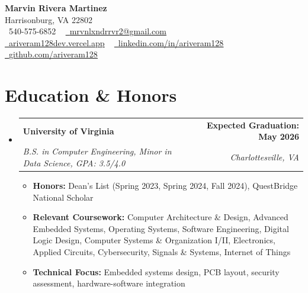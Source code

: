 \documentclass[letterpaper,11pt]{article}
\makeatletter
\newcommand{\resumeItem}[1]{
  \item\small{
    {#1 \vspace{-2pt}}
  }
}
\newcommand{\resumeSubheading}[4]{
  \vspace{-1pt}\item
    \begin{tabular*}{0.99\textwidth}[t]{l@{\extracolsep{\fill}}r}
      \textbf{#1} & \textbf{\small #2} \\
      \textit{\small#3} & \textit{\small #4} \\
    \end{tabular*}\vspace{-5pt}
}
\newcommand{\resumeSubHeadingListStart}{\begin{itemize}[leftmargin=0.0in, label={}]}
\newcommand{\resumeSubHeadingListEnd}{\end{itemize}}
\newcommand{\resumeItemListStart}{\begin{itemize}}
\newcommand{\resumeItemListEnd}{\end{itemize}\vspace{-3pt}}
\makeatother
\begin{document}
\begin{center}
    {\Huge \bfseries Marvin Rivera Martinez} \\ \vspace{1pt}
    Harrisonburg, VA 22802 \\ \vspace{1pt}
    \small \raisebox{-0.1\height}\faPhone\ 540-575-6852 ~ 
    \href{mailto:mrvnlxndrrvr2@gmail.com}{\raisebox{-0.2\height}\faEnvelope\ \underline{mrvnlxndrrvr2@gmail.com}} \\ \vspace{2pt}
    \href{https://ariveram128dev.vercel.app}{\raisebox{-0.2\height}\faGlobe\ \underline{ariveram128dev.vercel.app}} ~
    \href{https://linkedin.com/in/ariveram128}{\raisebox{-0.2\height}\faLinkedin\ \underline{linkedin.com/in/ariveram128}} ~
    \href{https://github.com/ariveram128}{\raisebox{-0.2\height}\faGithub\ \underline{github.com/ariveram128}}
    \vspace{-8pt}
\end{center}

\section{Education \& Honors}
  \resumeSubHeadingListStart
    \resumeSubheading
      {University of Virginia}{Expected Graduation: May 2026}
      {B.S. in Computer Engineering, Minor in Data Science, GPA: 3.5/4.0}{Charlottesville, VA}
      \resumeItemListStart
        \resumeItem{\textbf{Honors:} Dean's List (Spring 2023, Spring 2024, Fall 2024), QuestBridge National Scholar}
        \resumeItem{\textbf{Relevant Coursework:} Computer Architecture \& Design, Advanced Embedded Systems, Operating Systems, Software Engineering, Digital Logic Design, Computer Systems \& Organization I/II, Electronics, Applied Circuits, Cybersecurity, Signals \& Systems, Internet of Things}
        \resumeItem{\textbf{Technical Focus:} Embedded systems design, PCB layout, security assessment, hardware-software integration}
      \resumeItemListEnd
  \resumeSubHeadingListEnd

\end{document}
